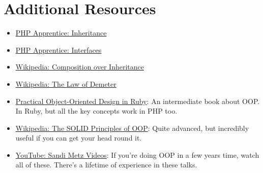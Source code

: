 \pagebreak

\section{Additional Resources}

\begin{itemize}[leftmargin=*]
    \item \href{https://phpapprentice.com/classes-inheritance.html}{PHP Apprentice: Inheritance}
    \item \href{https://phpapprentice.com/interfaces.html}{PHP Apprentice: Interfaces}
    \item \href{https://en.wikipedia.org/wiki/Composition\_over\_inheritance}{Wikipedia: Composition over Inheritance}
    \item \href{https://en.wikipedia.org/wiki/Law\_of\_Demeter}{Wikipedia: The Law of Demeter}
    \item \href{https://www.poodr.com}{Practical Object-Oriented Design in Ruby}: An intermediate book about OOP. In Ruby, but all the key concepts work in PHP too.
    \item \href{https://en.wikipedia.org/wiki/SOLID}{Wikipedia: The SOLID Principles of OOP}: Quite advanced, but incredibly useful if you can get your head round it.
    \item \href{https://www.youtube.com/channel/UCk3yOoaVtORwXipuLZ3jWNg}{YouTube: Sandi Metz Videos}: If you're doing OOP in a few years time, watch all of these. There's a lifetime of experience in these talks.
\end{itemize}
